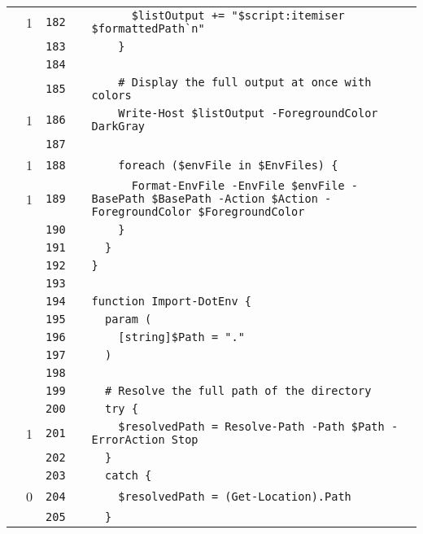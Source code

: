 \documentclass[a4paper,landscape,10pt]{article}
\begin{document}
\begin{longtable}[l]{lrrll}
\cellcolor{green} & 1 & \verb~182~ & & \verb~      $listOutput += "$script:itemiser $formattedPath`n"~\\
\cellcolor{gray} &  & \verb~183~ & & \verb~    }~\\
\cellcolor{gray} &  & \verb~184~ & & \verb~~\\
\cellcolor{gray} &  & \verb~185~ & & \verb~    # Display the full output at once with colors~\\
\cellcolor{green} & 1 & \verb~186~ & & \verb~    Write-Host $listOutput -ForegroundColor DarkGray~\\
\cellcolor{gray} &  & \verb~187~ & & \verb~~\\
\cellcolor{green} & 1 & \verb~188~ & & \verb~    foreach ($envFile in $EnvFiles) {~\\
\cellcolor{green} & 1 & \verb~189~ & & \verb~      Format-EnvFile -EnvFile $envFile -BasePath $BasePath -Action $Action -ForegroundColor $ForegroundColor~\\
\cellcolor{gray} &  & \verb~190~ & & \verb~    }~\\
\cellcolor{gray} &  & \verb~191~ & & \verb~  }~\\
\cellcolor{gray} &  & \verb~192~ & & \verb~}~\\
\cellcolor{gray} &  & \verb~193~ & & \verb~~\\
\cellcolor{gray} &  & \verb~194~ & & \verb~function Import-DotEnv {~\\
\cellcolor{gray} &  & \verb~195~ & & \verb~  param (~\\
\cellcolor{gray} &  & \verb~196~ & & \verb~    [string]$Path = "."~\\
\cellcolor{gray} &  & \verb~197~ & & \verb~  )~\\
\cellcolor{gray} &  & \verb~198~ & & \verb~~\\
\cellcolor{gray} &  & \verb~199~ & & \verb~  # Resolve the full path of the directory~\\
\cellcolor{gray} &  & \verb~200~ & & \verb~  try {~\\
\cellcolor{green} & 1 & \verb~201~ & & \verb~    $resolvedPath = Resolve-Path -Path $Path -ErrorAction Stop~\\
\cellcolor{gray} &  & \verb~202~ & & \verb~  }~\\
\cellcolor{gray} &  & \verb~203~ & & \verb~  catch {~\\
\cellcolor{red} & 0 & \verb~204~ & & \verb~    $resolvedPath = (Get-Location).Path~\\
\cellcolor{gray} &  & \verb~205~ & & \verb~  }~\\

\end{longtable}
\end{document}
